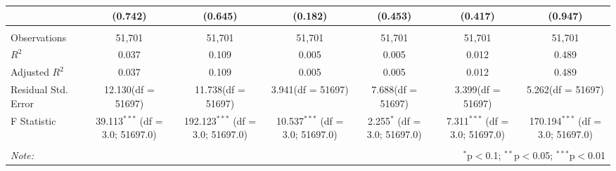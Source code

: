 \documentclass[12pt]{article}
\begin{document}
\begin{table}[!htbp]
\begin{tabular}{@{\extracolsep{5pt}}lcccccc}
  & (0.742) & (0.645) & (0.182) & (0.453) & (0.417) & (0.947) \\
\hline \\[-1.8ex]
 Observations & 51,701 & 51,701 & 51,701 & 51,701 & 51,701 & 51,701 \\
 $R^2$ & 0.037 & 0.109 & 0.005 & 0.005 & 0.012 & 0.489 \\
 Adjusted $R^2$ & 0.037 & 0.109 & 0.005 & 0.005 & 0.012 & 0.489 \\
 Residual Std. Error & 12.130(df = 51697) & 11.738(df = 51697) & 3.941(df = 51697) & 7.688(df = 51697) & 3.399(df = 51697) & 5.262(df = 51697)  \\
 F Statistic & 39.113$^{***}$ (df = 3.0; 51697.0) & 192.123$^{***}$ (df = 3.0; 51697.0) & 10.537$^{***}$ (df = 3.0; 51697.0) & 2.255$^{*}$ (df = 3.0; 51697.0) & 7.311$^{***}$ (df = 3.0; 51697.0) & 170.194$^{***}$ (df = 3.0; 51697.0) \\
\hline
\hline \\[-1.8ex]
\textit{Note:} & \multicolumn{6}{r}{$^{*}$p$<$0.1; $^{**}$p$<$0.05; $^{***}$p$<$0.01} \\
\end{tabular}
\end{table}
\end{document}
